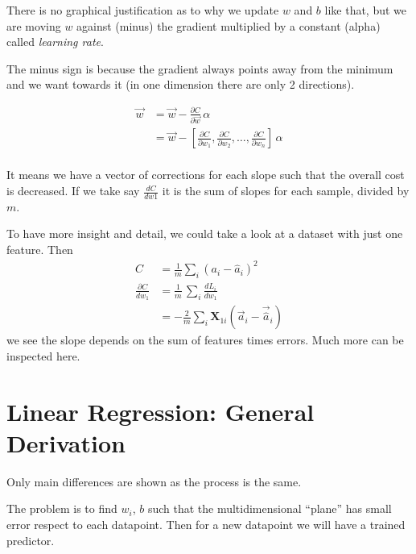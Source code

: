 There is no graphical justification as to why we update $w$ and $b$ like that, but we are moving $w$ against (minus) the gradient multiplied by a constant (alpha) called \textit{learning rate}.

The minus sign is because the gradient always points away from the minimum and we want towards it (in one dimension there are only 2 directions). 

\begin{align}
  \vec{w} &= \vec{w} -\frac{\partial C}{\partial \vec{w}}\,\alpha\\
  &= \vec{w} -[\frac{\partial C}{\partial w_1}, \frac{\partial C}{\partial w_2},\ldots, \frac{\partial C}{\partial w_n}]\,\alpha\\
\end{align}

It means we have a vector of corrections for each slope such that the overall cost is decreased. If we take say $\frac{dC}{dw1}$ it is the sum of slopes for each sample, divided by $m$. 

To have more insight and detail, we could take a look at a dataset with just one feature. Then 
\begin{align*}
  C &= \frac{1}{m}\sum_i(a_i - \hat{a}_i)^2 \\ 
  \frac{\partial C}{dw_1}&= \frac{1}{m}\,\sum_i \frac{dL_i}{dw_1} \\
  &= -\frac{2}{m}\sum_i \mathbf{X}_{1i}(\vec{a}_i-\vec{\hat{a}}_i)
\end{align*}
we see the slope depends on the sum of features times errors. Much more can be inspected here.


\section{Linear Regression: General Derivation}
Only main differences are shown as the process is the same.

The problem is to find $w_i$, $b$ such that the multidimensional ``plane'' has small error respect to each datapoint. Then for a new datapoint we will have a trained predictor.

